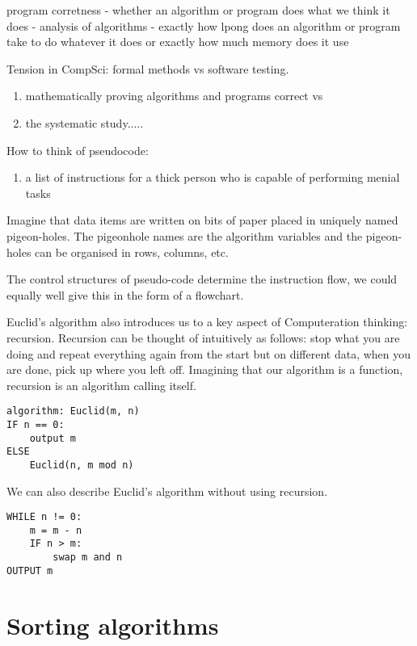 program corretness - whether an algorithm or program does what we think it does
- analysis of algorithms - exactly how lpong does an algorithm or program take to do whatever it does or exactly how much memory does it use

Tension in CompSci: formal methods vs software testing.
\begin{enumerate}
    \item mathematically proving algorithms and programs correct vs
    \item the systematic study.....
\end{enumerate}



How to think of pseudocode:
\begin{enumerate}
    \item a list of instructions for a thick person who is capable of performing menial tasks
\end{enumerate}

Imagine that data items are written on bits of paper placed in uniquely named pigeon-holes. The pigeonhole names are the algorithm variables and the pigeon-holes can be organised in rows, columns, etc.

The control structures of pseudo-code determine the instruction flow, we could equally well give this in the form of a flowchart.

Euclid's algorithm also introduces us to a key aspect of Computeration thinking: recursion. Recursion can be thought of intuitively as follows: stop what you are doing and repeat everything again from the start but on different data, when you are done, pick up where you left off. Imagining that our algorithm is a function, recursion is an algorithm calling itself.

\begin{verbatim}
algorithm: Euclid(m, n)
IF n == 0:
    output m
ELSE
    Euclid(n, m mod n)
\end{verbatim}

We can also describe Euclid's algorithm without using recursion.

\begin{verbatim}
WHILE n != 0:
    m = m - n
    IF n > m:
        swap m and n
OUTPUT m
\end{verbatim}

\section{Sorting algorithms}

